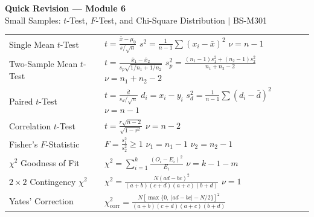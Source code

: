 \documentclass[12pt,a4paper]{article}
\renewcommand{\arraystretch}{1.45}
\begin{document}
\newpage

\begin{center}
  {\large\bfseries\color{myred} Quick Revision --- Module 6}\\[3pt]
  {\small\color{mydark} Small Samples: $t$-Test, $F$-Test, and Chi-Square Distribution $|$ BS-M301}
\end{center}
\noindent{\color{myred}\rule{\linewidth}{1.2pt}}
\vspace{1pt}

\begin{tcolorbox}[formulabox, title={\textbf{Key Small Sample and Chi-Square Formulas at a Glance}}]
\renewcommand{\arraystretch}{1.35}
\setlength{\tabcolsep}{5pt}
\noindent\begin{tabularx}{\linewidth}{B{3.5cm} Y}
Single Mean $t$-Test & $t = \frac{\bar{x} - \mu_0}{s / \sqrt{n}}$ \newline $s^2 = \frac{1}{n-1}\sum (x_i - \bar{x})^2$ \newline $\nu = n - 1$ \\[3pt]
Two-Sample Mean $t$-Test & $t = \frac{\bar{x}_1 - \bar{x}_2}{s_p\sqrt{1/n_1 + 1/n_2}}$ \newline $s_p^2 = \frac{(n_1-1)s_1^2 + (n_2-1)s_2^2}{n_1+n_2-2}$ \newline $\nu = n_1 + n_2 - 2$ \\[3pt]
Paired $t$-Test & $t = \frac{\bar{d}}{s_d / \sqrt{n}}$ \newline $d_i = x_i - y_i$ \newline $s_d^2 = \frac{1}{n-1}\sum (d_i - \bar{d})^2$ \newline $\nu = n - 1$ \\[3pt]
Correlation $t$-Test & $t = \frac{r\sqrt{n-2}}{\sqrt{1-r^2}}$ \newline $\nu = n - 2$ \\[3pt]
Fisher's $F$-Statistic & $F = \frac{s_1^2}{s_2^2} \ge 1$ \newline $\nu_1 = n_1 - 1$ \newline $\nu_2 = n_2 - 1$ \\[3pt]
$\chi^2$ Goodness of Fit & $\chi^2 = \sum_{i=1}^k \frac{(O_i - E_i)^2}{E_i}$ \newline $\nu = k - 1 - m$ \\[3pt]
$2 \times 2$ Contingency $\chi^2$ & $\chi^2 = \frac{N(ad - bc)^2}{(a+b)(c+d)(a+c)(b+d)}$ \newline $\nu = 1$ \\[3pt]
Yates' Correction & $\chi_{\text{corr}}^2 = \frac{N\left[\max\{0,\ |ad-bc|-N/2\}\right]^2}{(a+b)(c+d)(a+c)(b+d)}$ \\[3pt]
\end{tabularx}\par
\end{tcolorbox}
\end{document}
